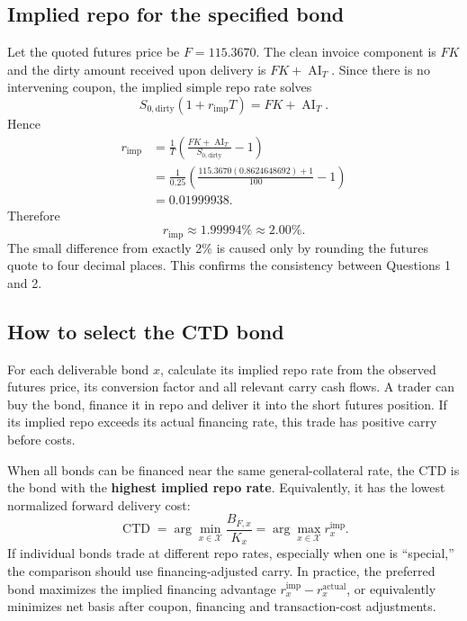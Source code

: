 \documentclass[11pt]{article}
\newcommand{\AI}{\operatorname{AI}}
\newcommand{\CTD}{\operatorname{CTD}}
\numberwithin{equation}{section}
\begin{document}
\subsection{Implied repo for the specified bond}
Let the quoted futures price be $F=115.3670$. The clean invoice component is
$FK$ and the dirty amount received upon delivery is $FK+\AI_T$. Since there is
no intervening coupon, the implied simple repo rate solves
\begin{equation}
S_{0,\mathrm{dirty}}(1+r_{\mathrm{imp}}T)=FK+\AI_T.
\end{equation}
Hence
\begin{align}
r_{\mathrm{imp}}
&=\frac{1}{T}
\left(\frac{FK+\AI_T}{S_{0,\mathrm{dirty}}}-1\right)\\
&=\frac{1}{0.25}
\left(\frac{115.3670(0.8624648692)+1}{100}-1\right)\\
&=0.01999938.
\end{align}
Therefore
\begin{equation}
\boxed{r_{\mathrm{imp}}\approx1.99994\%\approx2.00\%.}
\end{equation}
The small difference from exactly 2\% is caused only by rounding the futures
quote to four decimal places. This confirms the consistency between Questions
1 and 2.

\subsection{How to select the CTD bond}
For each deliverable bond $x$, calculate its implied repo rate from the observed
futures price, its conversion factor and all relevant carry cash flows. A trader
can buy the bond, finance it in repo and deliver it into the short futures
position. If its implied repo exceeds its actual financing rate, this trade has
positive carry before costs.

When all bonds can be financed near the same general-collateral rate, the CTD is
the bond with the \textbf{highest implied repo rate}. Equivalently, it has the
lowest normalized forward delivery cost:
\begin{equation}
\boxed{
\CTD=\arg\min_{x\in\mathcal X}\frac{B_{F,x}}{K_x}
=\arg\max_{x\in\mathcal X}r^{\mathrm{imp}}_x.}
\end{equation}
If individual bonds trade at different repo rates, especially when one is
``special,'' the comparison should use financing-adjusted carry. In practice,
the preferred bond maximizes the implied financing advantage
$r^{\mathrm{imp}}_x-r^{\mathrm{actual}}_x$, or equivalently minimizes net basis
after coupon, financing and transaction-cost adjustments.
\end{document}
